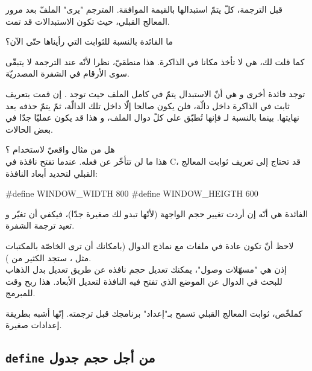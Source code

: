 \begin{Csource}
int main(int argc, char *argv[])
{
	int lives = 3;
  /* Code ... */
\end{Csource}

قبل الترجمة، كلّ
يتمّ استبدالها بالقيمة الموافقة. المترجم "يرى" الملفّ بعد مرور المعالج القبلي، حيث تكون الاستبدالات قد تمت.

\begin{question}
ما الفائدة بالنسبة للثوابت التي رأيناها حتّى الآن؟
\end{question}

كما قلت لك، هي لا تأخذ مكانا في الذاكرة. هذا منطقيّ، نظرا لأنّه عند الترجمة لا يتبقّى سوى الأرقام في الشفرة المصدريّة.

توجد فائدة أخرى و هي أنّ الاستبدال يتمّ في كامل الملف حيث توجد
.
إن قمت بتعريف ثابت في الذاكرة داخل دالّة، فلن يكون صالحا إلّا داخل تلك الدالّة، ثمّ يتمّ حذفه بعد نهايتها.
بينما بالنسبة لـ
فإنها تُطبّق على كلّ دوال الملف، و هذا قد يكون عمليّا جدّا في بعض الحالات.

هل من مثال واقعيّ لاستخدام
؟\\
هذا ما لن تتأخّر عن فعله. عندما تفتح نافذة في
\textenglish{C}، قد تحتاج إلى تعريف ثوابت المعالج القبلي لتحديد أبعاد النافذة:

\begin{Csource}
#define WINDOW_WIDTH 800
#define WINDOW_HEIGTH 600
\end{Csource}

الفائدة هي أنّه إن أردت تغيير حجم الواجهة (لأنّها تبدو لك صغيرة جدّا)، فيكفي أن تغيّر
و تعيد ترجمة الشفرة.

لاحظ أنّ
تكون عادة في ملفات
مع نماذج الدوال (بامكانك أن ترى
الخاصّة بالمكتبات مثل
،
ستجد الكثير من
).\\
إذن هي "مسهّلات وصول"، يمكنك تعديل حجم نافذه عن طريق تعديل
بدل الذهاب للبحث في الدوال عن الموضع الذي تفتح فيه النافذة لتعديل الأبعاد. هذا ربح وقت للمبرمج.

كملخّص، ثوابت المعالج القبلي تسمح بـ"إعداد" برنامجك قبل ترجمته. إنّها أشبه بطريقة إعدادات صغيرة.

\subsection{\texttt{define} من أجل حجم جدول}

